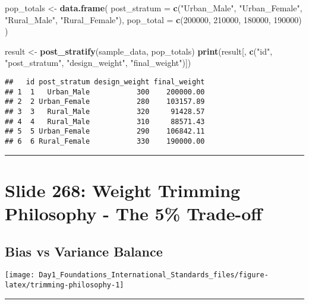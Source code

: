 \documentclass[
]{article}
\newenvironment{Shaded}{\begin{snugshade}}{\end{snugshade}}
\newcommand{\AttributeTok}[1]{\textcolor[rgb]{0.13,0.29,0.53}{#1}}
\newcommand{\DecValTok}[1]{\textcolor[rgb]{0.00,0.00,0.81}{#1}}
\newcommand{\FunctionTok}[1]{\textcolor[rgb]{0.13,0.29,0.53}{\textbf{#1}}}
\newcommand{\NormalTok}[1]{#1}
\newcommand{\OtherTok}[1]{\textcolor[rgb]{0.56,0.35,0.01}{#1}}
\newcommand{\StringTok}[1]{\textcolor[rgb]{0.31,0.60,0.02}{#1}}
\begin{document}
\begin{Shaded}
\begin{Highlighting}[]
\NormalTok{pop\_totals }\OtherTok{\textless{}{-}} \FunctionTok{data.frame}\NormalTok{(}
  \AttributeTok{post\_stratum =} \FunctionTok{c}\NormalTok{(}\StringTok{"Urban\_Male"}\NormalTok{, }\StringTok{"Urban\_Female"}\NormalTok{, }\StringTok{"Rural\_Male"}\NormalTok{, }\StringTok{"Rural\_Female"}\NormalTok{),}
  \AttributeTok{pop\_total =} \FunctionTok{c}\NormalTok{(}\DecValTok{200000}\NormalTok{, }\DecValTok{210000}\NormalTok{, }\DecValTok{180000}\NormalTok{, }\DecValTok{190000}\NormalTok{)}
\NormalTok{)}

\NormalTok{result }\OtherTok{\textless{}{-}} \FunctionTok{post\_stratify}\NormalTok{(sample\_data, pop\_totals)}
\FunctionTok{print}\NormalTok{(result[, }\FunctionTok{c}\NormalTok{(}\StringTok{"id"}\NormalTok{, }\StringTok{"post\_stratum"}\NormalTok{, }\StringTok{"design\_weight"}\NormalTok{, }\StringTok{"final\_weight"}\NormalTok{)])}
\end{Highlighting}
\end{Shaded}

\begin{verbatim}
##   id post_stratum design_weight final_weight
## 1  1   Urban_Male           300    200000.00
## 2  2 Urban_Female           280    103157.89
## 3  3   Rural_Male           320     91428.57
## 4  4   Rural_Male           310     88571.43
## 5  5 Urban_Female           290    106842.11
## 6  6 Rural_Female           330    190000.00
\end{verbatim}

\begin{center}\rule{0.5\linewidth}{0.5pt}\end{center}

\section{Slide 268: Weight Trimming Philosophy - The 5\%
Trade-off}\label{slide-268-weight-trimming-philosophy---the-5-trade-off}

\subsection{Bias vs Variance Balance}\label{bias-vs-variance-balance}

\texttt{[image: Day1\_Foundations\_International\_Standards\_files/figure-latex/trimming-philosophy-1]}

\begin{center}\rule{0.5\linewidth}{0.5pt}\end{center}
\end{document}
